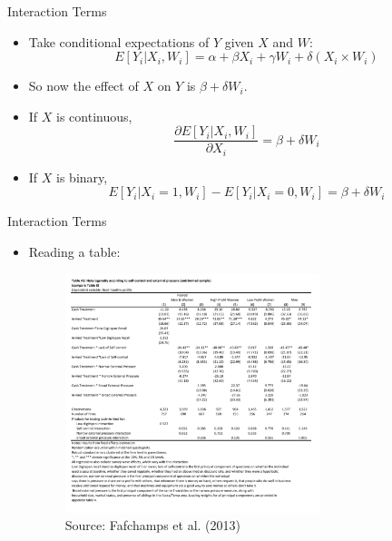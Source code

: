 \documentclass[11pt,notes=hide,aspectratio=169,mathserif]{beamer}
\begin{document}
\begin{frame}{Interaction Terms}
\begin{itemize}
\item Take conditional expectations of $Y$ given $X$ and $W$:
\begin{equation}
\label{eq:3}
    E[Y_i|X_i,W_i] = \alpha + \beta X_i + \gamma W_i + \delta (X_i \times W_i)
\end{equation}
\item So now the effect of $X$ on $Y$ is $\beta + \delta W_i$.
\item If $X$ is continuous, 
\begin{equation}
\label{eq:4}
    \frac{\partial E[Y_i|X_i,W_i]}{\partial X_i} = \beta + \delta W_i
\end{equation}
\item If $X$ is binary,
\begin{equation}
\label{eq:5}
    E[Y_i|X_i=1,W_i] - E[Y_i|X_i=0,W_i] = \beta + \delta W_i
\end{equation}
\end{itemize}
\end{frame}

\begin{frame}{Interaction Terms}
\begin{itemize}
\item Reading a table:
\begin{figure}
\centering
\includegraphics[width=0.7\textwidth]{inputs/interactions.png}
\caption{Source: Fafchamps et al. (2013)}
\end{figure}
\end{itemize}
\end{frame}
\end{document}
